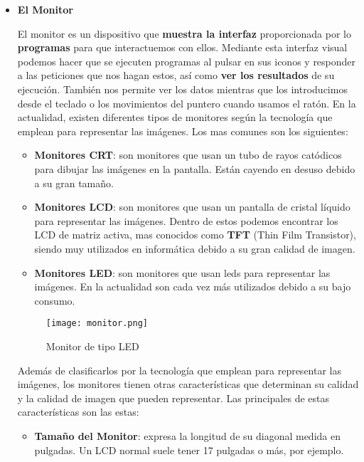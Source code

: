 \vspace{3ex}
\begin{itemize}
    \item \textbf{El Monitor}

    El monitor es un dispositivo que \textbf{muestra la interfaz} proporcionada por lo \textbf{programas} para que interactuemos con ellos. Mediante esta interfaz visual podemos hacer que se ejecuten programas al pulsar en sus iconos y responder a las peticiones que nos hagan estos, así como \textbf{ver los resultados} de su ejecución. También nos permite ver los datos mientras que los introducimos desde el teclado o los movimientos del puntero cuando usamos el ratón. En la actualidad, existen diferentes tipos de monitores según la tecnología que emplean para representar las imágenes. Los mas comunes son los siguientes:

    \begin{itemize}
        \item \textbf{Monitores CRT}: son monitores que usan un tubo de rayos catódicos para dibujar las imágenes en la pantalla. Están cayendo en desuso debido a su gran tamaño.

        \item \textbf{Monitores LCD}: son monitores que usan un pantalla de cristal líquido para representar las imágenes. Dentro de estos podemos encontrar los LCD de matriz activa, mas conocidos como \textbf{TFT} (Thin Film Transistor), siendo muy utilizados en informática debido a su gran calidad de imagen.

        \item \textbf{Monitores LED}: son monitores que usan leds para representar las imágenes. En la actualidad son cada vez más utilizados debido a su bajo consumo.
    \end{itemize}

     \begin{figure}[ht]
        \centering
        \texttt{[image: monitor.png]}
        \caption{Monitor de tipo LED}
    \end{figure}

    Además de clasificarlos por la tecnología que emplean para representar las imágenes, los monitores tienen otras características que determinan su calidad y la calidad de imagen que pueden representar. Las principales de estas características son las estas:

    \begin{itemize}
        \item \textbf{Tamaño del Monitor}: expresa la longitud de su diagonal medida en pulgadas. Un LCD normal suele tener 17 pulgadas o más, por ejemplo.


\end{itemize}
\end{itemize}
